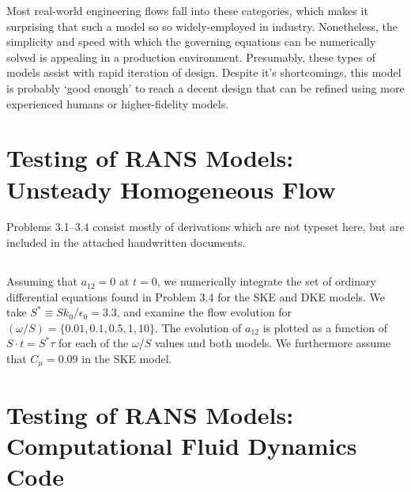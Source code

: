 \documentclass[11pt]{article}
\begin{document}
Most real-world engineering flows fall into these categories, which makes it surprising that such a model so so widely-employed in industry. Nonetheless, the simplicity and speed with which the governing equations can be numerically solved is appealing in a production environment. Presumably, these types of models assist with rapid iteration of design. Despite it's shortcomings, this model is probably `good enough' to reach a decent design that can be refined using more experienced humans or higher-fidelity models.

\section{Testing of RANS Models: Unsteady Homogeneous Flow}

Problems 3.1--3.4 consist mostly of derivations which are not typeset here, but are included in the attached handwritten documents.
\setcounter{subsection}{4}

\subsection{}

Assuming that $a_{12}=0$ at $t=0$, we numerically integrate the set of ordinary differential equations found in Problem 3.4 for the SKE and DKE models. We take $S^* \equiv S k_0 / \epsilon_0 = 3.3$, and examine the flow evolution for $(\omega/S) = \{0.01,0.1,0.5,1,10\}$. The evolution of $a_{12}$ is plotted as a function of $S \cdot t = S^* \tau$ for each of the $\omega/S$ values and both models. We furthermore assume that $C_\mu = 0.09$ in the SKE model.

\subsection{}

\subsection{}

\section{Testing of RANS Models: Computational Fluid Dynamics Code}

\subsection{}

\end{document}
